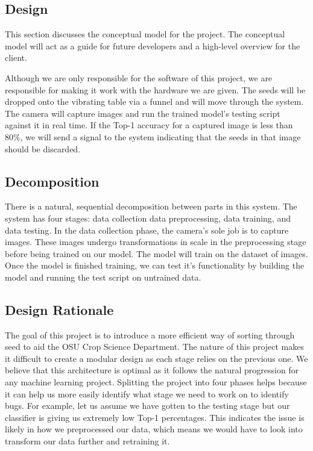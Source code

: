 \documentclass[onecolumn, draftclsnofoot,10pt, compsoc]{IEEEtran}
\begin{document}
\subsection{Design}

This section discusses the conceptual model for the project. The conceptual model will act as a guide for future developers and a high-level overview for the client. 

Although we are only responsible for the software of this project, we are responsible for making it work with the hardware we are given. The seeds will be dropped onto the vibrating table via a funnel and will move through the system. The camera will capture images and run the trained model's testing script against it in real time. If the Top-1 accuracy for a captured image is less than 80\%, we will send a signal to the system indicating that the seeds in that image should be discarded.

\subsection{Decomposition}
There is a natural, sequential decomposition between parts in this system. The system has four stages: data collection data preprocessing, data training, and data testing. In the data collection phase, the camera's sole job is to capture images. These images undergo transformations in scale in the preprocessing stage before being trained on our model. The model will train on the dataset of images. Once the model is finished training, we can test it's functionality by building the model and running the test script on untrained data.

\subsection{Design Rationale}
The goal of this project is to introduce a more efficient way of sorting through seed to aid the OSU Crop Science Department. 
The nature of this project makes it difficult to create a modular design as each stage relies on the previous one. We believe that this architecture is optimal as it follows the natural progression for any machine learning project. Splitting the project into four phases helps because it can help us more easily identify what stage we need to work on to identify bugs. For example, let us assume we have gotten to the testing stage but our classifier is giving us extremely low Top-1 percentages. This indicates the issue is likely in how we preprocessed our data, which means we would have to look into transform our data further and retraining it.
\end{document}
